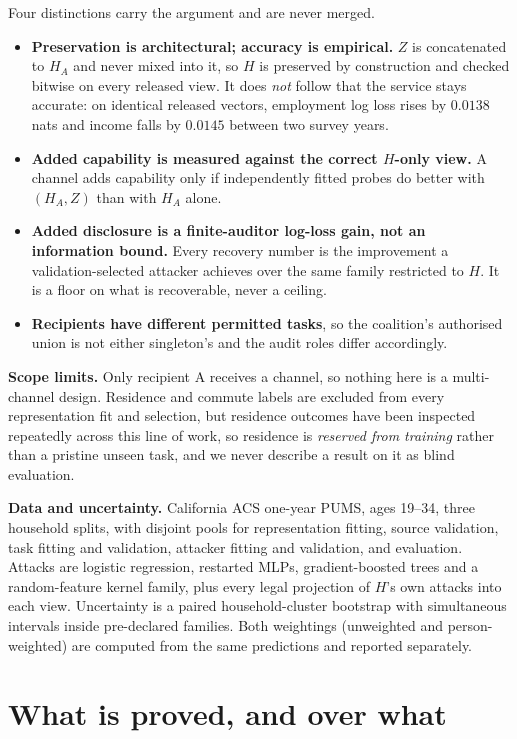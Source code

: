 \documentclass[conference]{IEEEtran}
\begin{document}
Four distinctions carry the argument and are never merged.

\begin{itemize}\itemsep2pt
\item \textbf{Preservation is architectural; accuracy is empirical.} $Z$ is concatenated to $H_A$ and
never mixed into it, so $H$ is preserved by construction and checked bitwise on every released view. It
does \emph{not} follow that the service stays accurate: on identical released vectors, employment log
loss rises by $0.0138$ nats and income falls by $0.0145$ between two survey years.
\item \textbf{Added capability is measured against the correct $H$-only view.} A channel adds capability
only if independently fitted probes do better with $(H_A,Z)$ than with $H_A$ alone.
\item \textbf{Added disclosure is a finite-auditor log-loss gain, not an information bound.} Every
recovery number is the improvement a validation-selected attacker achieves over the same family
restricted to $H$. It is a floor on what is recoverable, never a ceiling.
\item \textbf{Recipients have different permitted tasks}, so the coalition's authorised union is not
either singleton's and the audit roles differ accordingly.
\end{itemize}

\textbf{Scope limits.} Only recipient A receives a channel, so nothing here is a multi-channel design.
Residence and commute labels are excluded from every representation fit and selection, but residence
outcomes have been inspected repeatedly across this line of work, so residence is \emph{reserved from
training} rather than a pristine unseen task, and we never describe a result on it as blind evaluation.

\textbf{Data and uncertainty.} California ACS one-year PUMS, ages 19--34, three household splits, with
disjoint pools for representation fitting, source validation, task fitting and validation, attacker
fitting and validation, and evaluation. Attacks are logistic regression, restarted MLPs, gradient-boosted
trees and a random-feature kernel family, plus every legal projection of $H$'s own attacks into each
view. Uncertainty is a paired household-cluster bootstrap with simultaneous intervals inside
pre-declared families. Both weightings (unweighted and person-weighted) are computed from the same
predictions and reported separately.

\section{What is proved, and over what}
\label{sec:proved}
\end{document}
